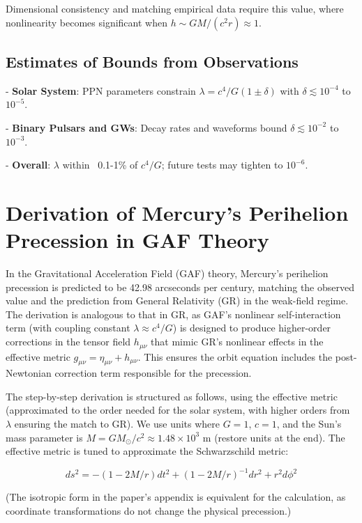\documentclass{article}
\begin{document}
Dimensional consistency and matching empirical data require this value, where nonlinearity becomes significant when \(h \sim GM/(c^2 r) \approx 1\).

\subsection{Estimates of Bounds from Observations}

- \textbf{Solar System}: PPN parameters constrain \(\lambda = c^4 / G (1 \pm \delta)\) with \(\delta \lesssim 10^{-4}\) to \(10^{-5}\).

- \textbf{Binary Pulsars and GWs}: Decay rates and waveforms bound \(\delta \lesssim 10^{-2}\) to \(10^{-3}\).

- \textbf{Overall}: \(\lambda\) within ~0.1-1\% of \(c^4 / G\); future tests may tighten to \(10^{-6}\).

\section{Derivation of Mercury's Perihelion Precession in GAF Theory}

In the Gravitational Acceleration Field (GAF) theory, Mercury's perihelion precession is predicted to be 42.98 arcseconds per century, matching the observed value and the prediction from General Relativity (GR) in the weak-field regime. The derivation is analogous to that in GR, as GAF's nonlinear self-interaction term (with coupling constant \(\lambda \approx c^4 / G\)) is designed to produce higher-order corrections in the tensor field \(h_{\mu\nu}\) that mimic GR's nonlinear effects in the effective metric \(g_{\mu\nu} = \eta_{\mu\nu} + h_{\mu\nu}\). This ensures the orbit equation includes the post-Newtonian correction term responsible for the precession.

The step-by-step derivation is structured as follows, using the effective metric (approximated to the order needed for the solar system, with higher orders from \(\lambda\) ensuring the match to GR). We use units where \(G = 1\), \(c = 1\), and the Sun's mass parameter is \(M = GM_\odot / c^2 \approx 1.48 \times 10^3\) m (restore units at the end). The effective metric is tuned to approximate the Schwarzschild metric:

\begin{equation}
ds^2 = - (1 - 2M/r) dt^2 + (1 - 2M/r)^{-1} dr^2 + r^2 d\phi^2
\end{equation}

(The isotropic form in the paper's appendix is equivalent for the calculation, as coordinate transformations do not change the physical precession.)
\end{document}
